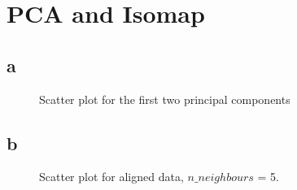 \documentclass[a4paper,12pt]{article}
\begin{document}
\tableofcontents %
\newpage

\section{PCA and Isomap}
\subsection{a}
\begin{figure}[H]
\hfill
{}
\hfill
\caption{Scatter plot for the first two principal components}
\label{41}
\end{figure}

\subsection{b}

\begin{figure}[H]
\hfill
{}
\hfill
\caption{Scatter plot for aligned data, $n\_neighbours$ = 5.}
\label{51}
\end{figure}
\end{document}
